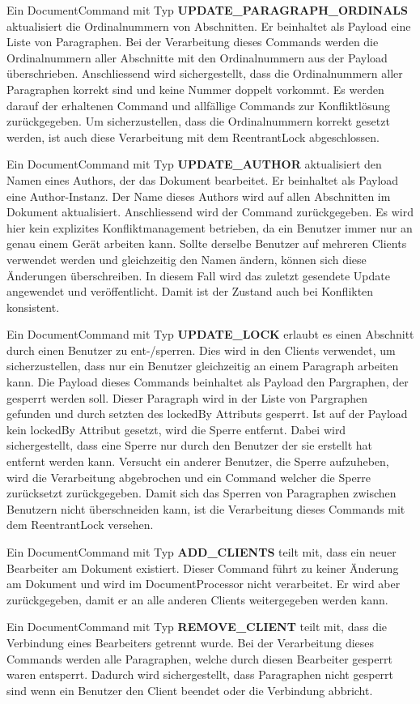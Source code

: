 Ein DocumentCommand mit Typ \textbf{UPDATE\_PARAGRAPH\_ORDINALS} aktualisiert die Ordinalnummern von Abschnitten.
Er beinhaltet als Payload eine Liste von Paragraphen.
Bei der Verarbeitung dieses Commands werden die Ordinalnummern aller Abschnitte mit den Ordinalnummern aus der Payload überschrieben.
Anschliessend wird sichergestellt, dass die Ordinalnummern aller Paragraphen korrekt sind und keine Nummer doppelt vorkommt.
Es werden darauf der erhaltenen Command und allfällige Commands zur Konfliktlösung zurückgegeben.
Um sicherzustellen, dass die Ordinalnummern korrekt gesetzt werden, ist auch diese Verarbeitung mit dem ReentrantLock abgeschlossen.

Ein DocumentCommand mit Typ \textbf{UPDATE\_AUTHOR} aktualisiert den Namen eines Authors, der das Dokument bearbeitet.
Er beinhaltet als Payload eine Author-Instanz.
Der Name dieses Authors wird auf allen Abschnitten im Dokument aktualisiert.
Anschliessend wird der Command zurückgegeben.
Es wird hier kein explizites Konfliktmanagement betrieben, da ein Benutzer immer nur an genau einem Gerät arbeiten kann.
Sollte derselbe Benutzer auf mehreren Clients verwendet werden und gleichzeitig den Namen ändern, können sich diese Änderungen überschreiben.
In diesem Fall wird das zuletzt gesendete Update angewendet und veröffentlicht.
Damit ist der Zustand auch bei Konflikten konsistent.

Ein DocumentCommand mit Typ \textbf{UPDATE\_LOCK} erlaubt es einen Abschnitt durch einen Benutzer zu ent-/sperren.
Dies wird in den Clients verwendet, um sicherzustellen, dass nur ein Benutzer gleichzeitig an einem Paragraph arbeiten kann.
Die Payload dieses Commands beinhaltet als Payload den Pargraphen, der gesperrt werden soll.
Dieser Paragraph wird in der Liste von Pargraphen gefunden und durch setzten des lockedBy Attributs gesperrt.
Ist auf der Payload kein lockedBy Attribut gesetzt, wird die Sperre entfernt.
Dabei wird sichergestellt, dass eine Sperre nur durch den Benutzer der sie erstellt hat entfernt werden kann.
Versucht ein anderer Benutzer, die Sperre aufzuheben, wird die Verarbeitung abgebrochen und ein Command welcher die Sperre zurücksetzt zurückgegeben.
Damit sich das Sperren von Paragraphen zwischen Benutzern nicht überschneiden kann, ist die Verarbeitung dieses Commands mit dem ReentrantLock versehen. 

Ein DocumentCommand mit Typ \textbf{ADD\_CLIENTS} teilt mit, dass ein neuer Bearbeiter am Dokument existiert.
Dieser Command führt zu keiner Änderung am Dokument und wird im DocumentProcessor nicht verarbeitet.
Er wird aber zurückgegeben, damit er an alle anderen Clients weitergegeben werden kann.

Ein DocumentCommand mit Typ \textbf{REMOVE\_CLIENT} teilt mit, dass die Verbindung eines Bearbeiters getrennt wurde.
Bei der Verarbeitung dieses Commands werden alle Paragraphen, welche durch diesen Bearbeiter gesperrt waren entsperrt.
Dadurch wird sichergestellt, dass Paragraphen nicht gesperrt sind wenn ein Benutzer den Client beendet oder die Verbindung abbricht.

\clearpage
